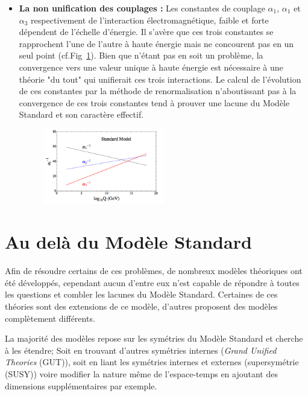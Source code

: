 \begin{itemize}[label=$\bullet$]
\item \textbf{La non unification des couplages : }Les constantes de couplage $\alpha_{1}$, $\alpha_{1}$ et $\alpha_{3}$ respectivement de l'interaction électromagnétique, faible et forte dépendent de l'échelle d'énergie. Il s'avère que ces trois constantes se rapprochent l'une de l'autre à haute énergie mais ne concourent pas en un seul point (cf.Fig~\ref{constantes}). Bien que n'étant pas en soit un problème, la convergence vers une valeur unique à haute énergie est nécessaire à une théorie "du tout" qui unifierait ces trois interactions. Le calcul de l'évolution de ces constantes par la méthode de renormalisation n'aboutissant pas à la convergence de ces trois constantes tend à prouver une lacune du Modèle Standard et son caractère effectif.
\begin{figure}[ht!]
\centering
\includegraphics[width=0.50\textwidth]{SM/couplageSM.jpg}
\label{constantes}
\end{figure}
\end{itemize}

\section{Au delà du Modèle Standard}
Afin de résoudre certains de ces problèmes, de nombreux modèles théoriques ont été développés, cependant aucun d'entre eux n'est capable de répondre à toutes les questions et combler les lacunes du Modèle Standard. Certaines de ces théories sont des extensions de ce modèle, d'autres proposent des modèles complètement différents.

La majorité des modèles repose sur les symétries du Modèle Standard et cherche à les étendre; Soit en trouvant d'autres symétries internes (\textit{Grand Unified Theories} (GUT)), soit en liant les symétries internes et externes (supersymétrie (SUSY)) voire  modifier la nature même de l'espace-temps en ajoutant des dimensions supplémentaires par exemple.

